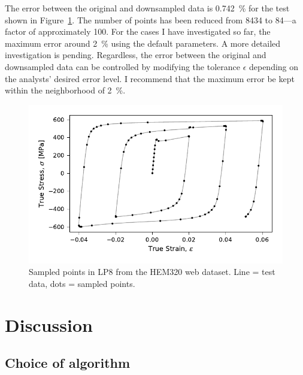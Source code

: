 \documentclass[a4paper,11pt]{article}
\begin{document}
The error between the original and downsampled data is 0.742~\% for the test shown in Figure~\ref{fig:hem320-lp8-results}.
The number of points has been reduced from 8434 to 84---a factor of approximately 100.
For the cases I have investigated so far, the maximum error around 2~\% using the default parameters.
A more detailed investigation is pending.
Regardless, the error between the original and downsampled data can be controlled by modifying the tolerance $\epsilon$ depending on the analysts' desired error level.
I recommend that the maximum error be kept within the neighborhood of 2~\%.



\begin{figure}
    \centering
    \includegraphics{HEM320_C_LP8_inds.pdf}
    \caption{Sampled points in LP8 from the HEM320 web dataset. Line = test data, dots = sampled points.}
    \label{fig:hem320-lp8-results}
\end{figure}

\section{Discussion}

\subsection{Choice of algorithm}
\end{document}
